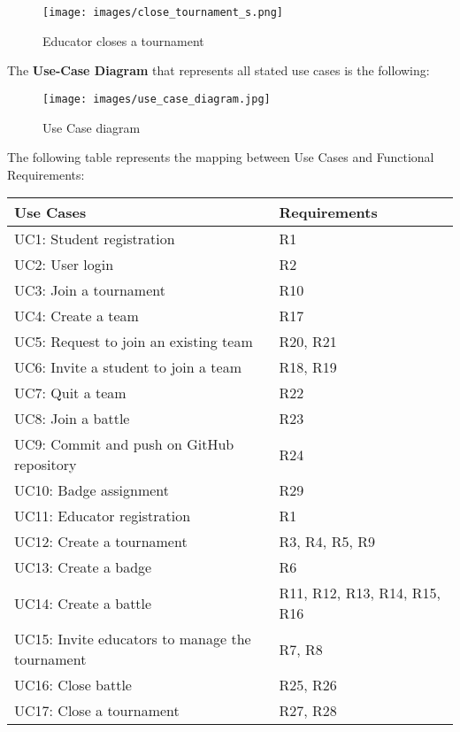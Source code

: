 \documentclass[a4paper, 11pt, titlepage]{article}
\begin{document}
\begin{figure}[h!]
    \centering
    \texttt{[image: images/close\_tournament\_s.png]}
    \caption{Educator closes a tournament}
    \label{fig:seq_diag_close_tournament}
    
\end{figure}

\clearpage

The \textbf{Use-Case Diagram} that represents all stated use cases is the following:

\hfill

\begin{figure}[h!]
    \centering

    \texttt{[image: images/use\_case\_diagram.jpg]}
    \caption{Use Case diagram}
    \label{fig:use_case_diagram}
    
\end{figure}

\clearpage

The following table represents the mapping between Use Cases and Functional Requirements:

\hfill

\begin{center}
    \begin{tabularx}{\linewidth} {|l|X|}
        \hline
        \textbf{Use Cases} & \textbf{Requirements}\\
        \hline
        UC1: Student registration & R1\\
        \hline
        UC2: User login & R2\\
        \hline
        UC3: Join a tournament & R10\\
        \hline
        UC4: Create a team & R17\\
        \hline
        UC5: Request to join an existing team  & R20, R21 \\
        \hline
        UC6: Invite a student to join a team & R18, R19\\
        \hline
        UC7: Quit a team & R22\\
        \hline
        UC8: Join a battle & R23 \\
        \hline
        UC9: Commit and push on GitHub repository & R24\\
        \hline
        UC10: Badge assignment & R29 \\
        \hline
        UC11: Educator registration & R1\\
        \hline
        UC12: Create a tournament & R3, R4, R5, R9\\
        \hline
        UC13: Create a badge & R6\\
        \hline
        UC14: Create a battle & R11, R12, R13, R14, R15, R16\\
        \hline
        UC15: Invite educators to manage the tournament & R7, R8\\
        \hline 
        UC16: Close battle & R25, R26\\
        \hline
        UC17: Close a tournament & R27, R28\\
        \hline
    \end{tabularx}
\end{center}
\end{document}
